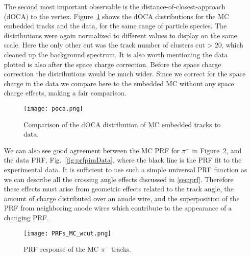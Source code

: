 The second most important observable is the distance-of-closest-approach (dOCA) to the vertex. Figure~\ref{fig:pocacomp} shows the dOCA distributions for the MC embedded tracks and the data, for the same range of particle species. The distributions were again normalized to different values to display on the same scale. Here the only other cut was the  track number of clusters cut > 20, which cleaned up the background spectrum. It is also worth mentioning the data plotted is also after the space charge correction. Before the space charge correction the distributions would be much wider. Since we correct for the space charge in the data we compare here to the embedded MC without any space charge effects, making a fair comparison. 

\begin{figure}[!hbt]
\texttt{[image: poca.png]}
\caption{Comparison of the dOCA distribution of MC embedded tracks to data.}
\label{fig:pocacomp}
\end{figure}


We can also see good agreement between the MC PRF for $\pi^-$ in Figure~\ref{fig:prfpimMC}, and the data PRF, Fig.~\ref{fig:prfpimData}, where the black line is the PRF fit to the experimental data. It is sufficient to use such a simple universal PRF function as we can describe all the crossing angle effects discussed in \ref{sec:prf}. Therefore these effects must arise from geometric effects related to the track angle, the amount of charge distributed over an anode wire, and the superposition of the PRF from neighboring anode wires which contribute to the appearance of a changing PRF.

\begin{figure}[!htb]
         \centering
         \texttt{[image: PRFs\_MC\_wcut.png]}
         \caption{PRF response of the MC $\pi^-$ tracks.}
         \label{fig:prfpimMC}
\end{figure}









